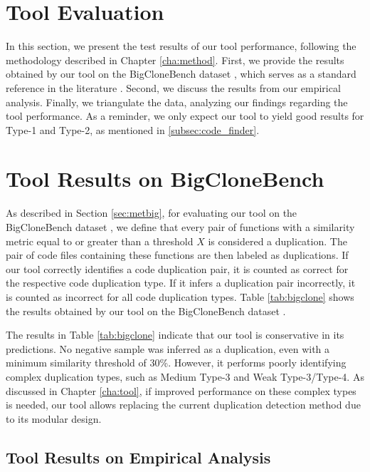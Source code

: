 \section{Tool Evaluation}
\label{sec:eval}

In this section, we present the test results of our tool performance, following the 
methodology described in Chapter \ref{cha:method}. First, we provide the results 
obtained by our tool on the BigCloneBench dataset \citep{bigclonebench}, which 
serves as a standard reference in the literature \citep{litreview}. Second, we 
discuss the results from our empirical analysis. Finally, we triangulate the data, 
analyzing our findings regarding the tool performance. 
As a reminder, we only expect our tool to yield good results for Type-1 and Type-2,
as mentioned in \ref{subsec:code_finder}.

\section{Tool Results on BigCloneBench}



As described in Section \ref{sec:metbig}, for evaluating our tool on the BigCloneBench dataset \citep{bigclonebench}, we define that every pair of functions with a similarity metric equal to or greater than a threshold \( X \) is considered a duplication. The pair of code files containing these functions are then labeled as duplications. If our tool correctly identifies a code duplication pair, it is counted as correct for the respective code duplication type. If it infers a duplication pair incorrectly, it is counted as incorrect for all code duplication types. Table \ref{tab:bigclone} shows the results obtained by our tool on the BigCloneBench dataset \citep{bigclonebench}.

The results in Table \ref{tab:bigclone} indicate that our tool is conservative in its predictions. No negative sample was inferred as a duplication, even with a minimum similarity threshold of 30\%. However, it performs poorly identifying complex duplication types, such as Medium Type-3 and Weak Type-3/Type-4. As discussed in Chapter \ref{cha:tool}, if improved performance on these complex types is needed, our tool allows replacing the current duplication detection method due to its modular design.

\subsection{Tool Results on Empirical Analysis}

